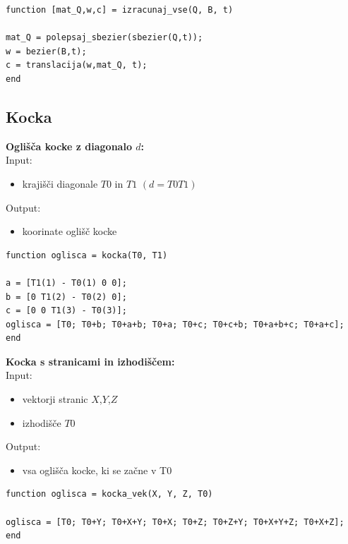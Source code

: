 \documentclass[12pt,a4paper,twoside]{article}
\theoremstyle{definition} %
\theoremstyle{plain} %
\numberwithin{equation}{section}  %
\begin{document}
\begin{lstlisting}[caption = {izracunaj\_vse}]
function [mat_Q,w,c] = izracunaj_vse(Q, B, t)

mat_Q = polepsaj_sbezier(sbezier(Q,t));
w = bezier(B,t);
c = translacija(w,mat_Q, t);
end
\end{lstlisting}

\newpage

\subsection{Kocka}

\textbf{Oglišča kocke z diagonalo $d$:}\\
Input:
\begin{itemize}
\item krajišči diagonale $T0$ in $T1$ $(d=T0 T1)$
\end{itemize}
Output:
\begin{itemize}
\item koorinate oglišč kocke
\end{itemize}

\begin{lstlisting}[caption = {kocka}]
function oglisca = kocka(T0, T1)

a = [T1(1) - T0(1) 0 0];
b = [0 T1(2) - T0(2) 0];
c = [0 0 T1(3) - T0(3)];
oglisca = [T0; T0+b; T0+a+b; T0+a; T0+c; T0+c+b; T0+a+b+c; T0+a+c];
end
\end{lstlisting}

\vspace{1cm}
\textbf{Kocka s stranicami in izhodiščem:}\\
Input:
\begin{itemize}
\item vektorji stranic $X$,$Y$,$Z$
\item izhodišče $T0$
\end{itemize}
Output:
\begin{itemize}
\item vsa oglišča kocke, ki se začne v T0
\end{itemize}

\begin{lstlisting}[caption = {kocka\_vek}]
function oglisca = kocka_vek(X, Y, Z, T0)

oglisca = [T0; T0+Y; T0+X+Y; T0+X; T0+Z; T0+Z+Y; T0+X+Y+Z; T0+X+Z];
end
\end{lstlisting}
\end{document}

